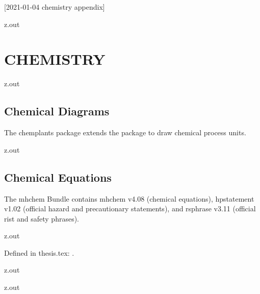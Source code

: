 [2021-01-04 chemistry appendix]

\begin{VerbatimOut}{z.out}
\chapter{CHEMISTRY}
\end{VerbatimOut}

\MyIOT


\begin{VerbatimOut}{z.out}

\section{Chemical Diagrams}

The chemplants package \cite{feffin2019}
extends the
\href{http://ctan.math.washington.edu/tex-archive/graphics/pgf/base/doc/pgfmanual.pdf}{\TikZ} package
to draw chemical process units.
\end{VerbatimOut}

\MyIO


\begin{VerbatimOut}{z.out}

\section{Chemical Equations}

The mhchem Bundle \cite{hensel2018}
contains mhchem v4.08 (chemical equations),
hpstatement v1.02 (official hazard and precautionary statements),
and rsphrase v3.11 (official rist and safety phrases).
\end{VerbatimOut}

\MyIO




\begin{VerbatimOut}{z.out}

Defined in thesis.tex: \nitrate.
\end{VerbatimOut}

\MyIOT


\begin{VerbatimOut}{z.out}

\end{VerbatimOut}

\MyIOT


\begin{VerbatimOut}{z.out}

\end{VerbatimOut}


